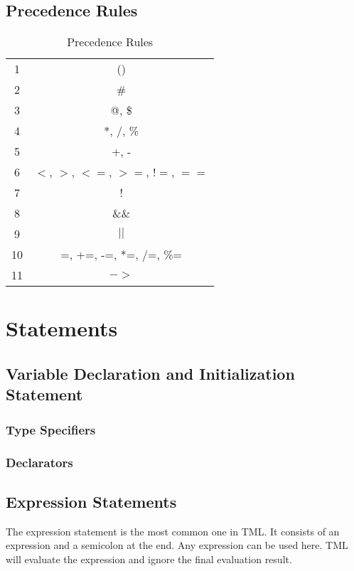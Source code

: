 \documentclass[12pt,psfig,a4]{article}
\begin{document}
\subsection{Precedence Rules}
\begin{table}[ht]
\begin{center}
\begin{tabular}{| c | c |}
\hline
1 & () \\
2 & \# \\
3 & @, \$ \\
4 & *, /, \% \\
5 & +, - \\
6 & $<$, $>$, $<=$, $>=$, $!=$, $==$ \\
7 & ! \\
8 & \&\& \\
9 & $||$ \\
10 & =, +=, -=, *=, /=, \%= \\
11 & $->$ \\
\hline
\end{tabular}
\caption{Precedence Rules}
\label{keywords}
\end {center}
\end{table}

\section{Statements}

\subsection{Variable Declaration and Initialization Statement}

\subsubsection{Type Specifiers}

\subsubsection{Declarators}

\subsection{Expression Statements}
The expression statement is the most common one in TML. It consists of an expression and a semicolon at the end. Any expression can be used here. TML will evaluate the expression and ignore the final evaluation result.
\end{document}
